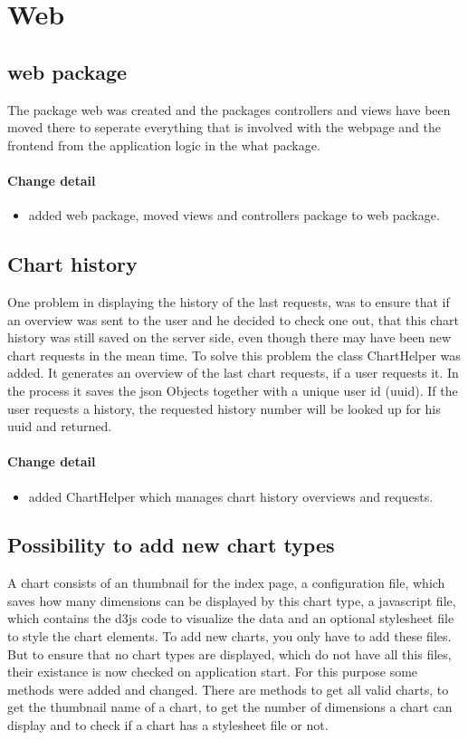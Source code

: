 \section{Web}
\subsection{web package}
The package web was created and the packages controllers and views have been moved there to seperate everything that is involved with the webpage and the frontend from the application logic in the what package.

\paragraph{Change detail}
\begin{itemize}
  \item added web package, moved views and controllers package to web package.
\end{itemize}

\subsection{Chart history}
One problem in displaying the history of the last requests, was to ensure that if an overview was sent to the user and he decided to check one out,
 that this chart history was still saved on the server side, even though there may have been new chart requests in the mean time.
To solve this problem the class ChartHelper was added. It generates an overview of the last chart requests, 
if a user requests it. In the process it saves the json Objects together with a unique user id (uuid). 
If the user requests a history, the requested history number will be looked up for his uuid and returned.

\paragraph{Change detail}
\begin{itemize}
  \item added ChartHelper which manages chart history overviews and requests.
\end{itemize}

\subsection{Possibility to add new chart types}
A chart consists of an thumbnail for the index page, a configuration file, which saves how many dimensions can be displayed by this chart type,
a javascript file, which contains the d3js code to visualize the data and an optional stylesheet file to style the chart elements.
To add new charts, you only have to add these files.
But to ensure that no chart types are displayed, which do not have all this files, their existance is now checked on application start.
For this purpose some methods were added and changed. There are methods to get all valid charts, to get the thumbnail name of a chart,
to get the number of dimensions a chart can display and to check if a chart has a stylesheet file or not.

